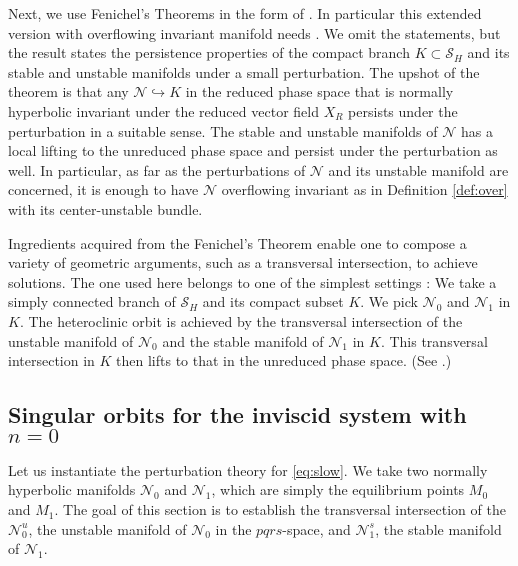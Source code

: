 \documentclass[a4paper,11pt]{article}
\theoremstyle{remark}
\begin{document}
Next, we use Fenichel's Theorems in the form of \cite[Theorem 2.2]{Sz1991}. In particular this extended version with overflowing invariant manifold needs \cite[Theorem 3]{fenichel_asymptotic_1977}. %
We omit the statements, but the result states the persistence properties of the compact branch $K\subset\mathcal{S}_H$ and its stable and unstable manifolds under a small perturbation. The upshot of the theorem is that any $\mathcal{N}\hookrightarrow K$ in the reduced phase space that is normally hyperbolic invariant under the reduced vector field $X_R$ persists under the perturbation in a suitable sense. The stable and unstable manifolds of $\mathcal{N}$ has a local lifting to the unreduced phase space and persist under the perturbation as well. In particular, as far as the perturbations of $\mathcal{N}$ and its unstable manifold are concerned, it is enough to have $\mathcal{N}$ overflowing invariant as in Definition \ref{def:over} with its center-unstable bundle.

Ingredients acquired from the Fenichel's Theorem enable one to compose a variety of geometric arguments, such as a transversal intersection, to achieve solutions. The one used here belongs to one of the simplest settings \cite[Theorem 3.1]{Sz1991}: We take a simply connected branch of  $\mathcal{S}_H$ and its compact subset $K$. We pick $\mathcal{N}_0$ and $\mathcal{N}_1$ in $K$. The heteroclinic orbit is achieved by the transversal intersection of the unstable manifold of $\mathcal{N}_0$ and the stable manifold of $\mathcal{N}_1$ in $K$. This transversal intersection in $K$ then lifts to that in the unreduced phase space. (See \cite{Sz1991}.) %

\subsection{Singular orbits for the inviscid system with $n=0$}\label{sec:singorb}

Let us instantiate the perturbation theory for \eqref{eq:slow}. We take two normally hyperbolic manifolds %
$\mathcal{N}_0$ and $\mathcal{N}_1$, which are simply the equilibrium points $M_0$ and $M_1$. The goal of this section is to establish the transversal intersection of the $\mathcal{N}_0^u$, the unstable manifold of $\mathcal{N}_0$ in the $pqrs$-space, and $\mathcal{N}^s_1$, the stable manifold of $\mathcal{N}_1$.  
\end{document}
